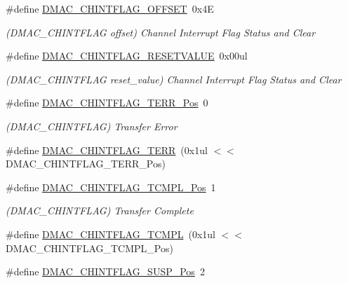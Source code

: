 \begin{DoxyCompactItemize}
\#define \mbox{\hyperlink{group___s_a_m_d21___d_m_a_c_ga214f8ef629a5407cb641fc29c432f501}{D\+M\+A\+C\+\_\+\+C\+H\+I\+N\+T\+F\+L\+A\+G\+\_\+\+O\+F\+F\+S\+ET}}~0x4E
\begin{DoxyCompactList}\small\item\em (D\+M\+A\+C\+\_\+\+C\+H\+I\+N\+T\+F\+L\+AG offset) Channel Interrupt Flag Status and Clear \end{DoxyCompactList}\item 
\#define \mbox{\hyperlink{group___s_a_m_d21___d_m_a_c_ga97ae1c21a5e11bf0b4a4fb681054909d}{D\+M\+A\+C\+\_\+\+C\+H\+I\+N\+T\+F\+L\+A\+G\+\_\+\+R\+E\+S\+E\+T\+V\+A\+L\+UE}}~0x00ul
\begin{DoxyCompactList}\small\item\em (D\+M\+A\+C\+\_\+\+C\+H\+I\+N\+T\+F\+L\+AG reset\+\_\+value) Channel Interrupt Flag Status and Clear \end{DoxyCompactList}\item 
\#define \mbox{\hyperlink{group___s_a_m_d21___d_m_a_c_ga5e720f036a844fb378db12da1e85f658}{D\+M\+A\+C\+\_\+\+C\+H\+I\+N\+T\+F\+L\+A\+G\+\_\+\+T\+E\+R\+R\+\_\+\+Pos}}~0
\begin{DoxyCompactList}\small\item\em (D\+M\+A\+C\+\_\+\+C\+H\+I\+N\+T\+F\+L\+AG) Transfer Error \end{DoxyCompactList}\item 
\#define \mbox{\hyperlink{group___s_a_m_d21___d_m_a_c_ga331cdfbec4f163e24ceae030631ec87b}{D\+M\+A\+C\+\_\+\+C\+H\+I\+N\+T\+F\+L\+A\+G\+\_\+\+T\+E\+RR}}~(0x1ul $<$$<$ D\+M\+A\+C\+\_\+\+C\+H\+I\+N\+T\+F\+L\+A\+G\+\_\+\+T\+E\+R\+R\+\_\+\+Pos)
\item 
\#define \mbox{\hyperlink{group___s_a_m_d21___d_m_a_c_gaa5cff060abf458e84ad9df6aae3321cb}{D\+M\+A\+C\+\_\+\+C\+H\+I\+N\+T\+F\+L\+A\+G\+\_\+\+T\+C\+M\+P\+L\+\_\+\+Pos}}~1
\begin{DoxyCompactList}\small\item\em (D\+M\+A\+C\+\_\+\+C\+H\+I\+N\+T\+F\+L\+AG) Transfer Complete \end{DoxyCompactList}\item 
\#define \mbox{\hyperlink{group___s_a_m_d21___d_m_a_c_ga5aa6c257ce581f7cdecdb31e15ab62a4}{D\+M\+A\+C\+\_\+\+C\+H\+I\+N\+T\+F\+L\+A\+G\+\_\+\+T\+C\+M\+PL}}~(0x1ul $<$$<$ D\+M\+A\+C\+\_\+\+C\+H\+I\+N\+T\+F\+L\+A\+G\+\_\+\+T\+C\+M\+P\+L\+\_\+\+Pos)
\item 
\#define \mbox{\hyperlink{group___s_a_m_d21___d_m_a_c_gabe5118389e9e2d3b469d6904cf19e3ce}{D\+M\+A\+C\+\_\+\+C\+H\+I\+N\+T\+F\+L\+A\+G\+\_\+\+S\+U\+S\+P\+\_\+\+Pos}}~2

\end{DoxyCompactItemize}
